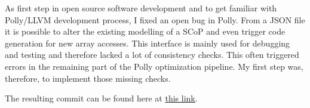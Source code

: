As first step in open source software development and to get familiar with Polly/LLVM development process, I fixed an open bug in Polly. From a JSON file it is possible to alter the existing modelling of a SCoP and even trigger code generation for new array accesses. This interface is mainly used for debugging and testing and therefore lacked a lot of consistency checks. This often triggered errors in the remaining part of the Polly optimization pipeline. My first step was, therefore, to implement those missing checks.

The resulting commit can be found here at \href{https://reviews.llvm.org/D32739}{this link}.
